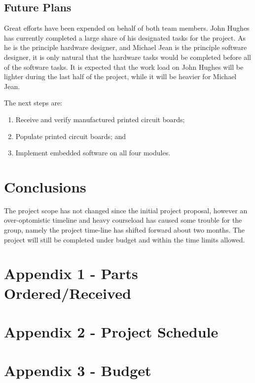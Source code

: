 \documentclass[12pt]{report}
\begin{document}
\subsection{Future Plans}

Great efforts have been expended on behalf of both team members. John Hughes has currently completed a large share of his designated tasks for the project. As he is the principle hardware designer, and Michael Jean is the principle software designer, it is only natural that the hardware tasks would be completed before all of the software tasks. It is expected that the work load on John Hughes will be lighter during the last half of the project, while it will be heavier for Michael Jean.

The next steps are:
\begin{enumerate}
\item Receive and verify manufactured printed circuit boards;
\item Populate printed circuit boards; and
\item Implement embedded software on all four modules.
\end{enumerate}

\pagebreak

\section{Conclusions}

The project scope has not changed since the initial project proposal, however an over-optomistic timeline and heavy courseload has caused some trouble for the group, namely the project time-line has shifted forward about two months. The project will still be completed under budget and within the time limits allowed. 

\pagebreak

\section{Appendix 1 - Parts Ordered/Received}

\pagebreak

\section{Appendix 2 - Project Schedule}

\pagebreak

\section{Appendix 3 - Budget}

\pagebreak
\end{document}
